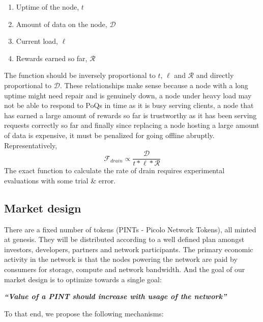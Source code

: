  \begin{enumerate}
	\item Uptime of the node, $t$
	\item Amount of data on the node, $\mathcal{D}$
	\item Current load, $\ell$
	\item Rewards earned so far, $\mathcal{R}$
\end{enumerate}
The function should be inversely proportional to $t$, $\ell$ and $\mathcal{R}$ and directly proportional to $\mathcal{D}$. These relationships make sense because a node with a long uptime might need repair and is genuinely down, a node under heavy load may not be able to respond to \textsf{PoQ}s in time as it is busy serving clients, a node that has earned a large amount of rewards so far is trustworthy as it has been serving requests correctly so far and finally since replacing a node hosting a  large amount of data is expensive, it must be penalized for going offline abruptly. Representatively,
\newline
$$ \mathcal{F}_{drain} \propto \frac{\mathcal{D}} {t * \ell * \mathcal{R}}$$
\newline
The exact function to calculate the rate of drain requires experimental evaluations with some trial \& error.

\subsection{Market design}
There are a fixed number of tokens (\textsf{PINT}s - \textsf{Picolo} Network Tokens), all minted at genesis. They will be distributed according to a well defined plan amongst investors, developers, partners and network participants. The primary economic activity in the network is that the nodes powering the network are paid by consumers for storage, compute and network bandwidth. And the goal of our market design is to optimize towards a single goal:
\begin{center}
	\textit{\large{\textbf{``Value of a PINT should increase with usage of the network''}}}
\end{center}
To that end, we propose the following mechanisms:
